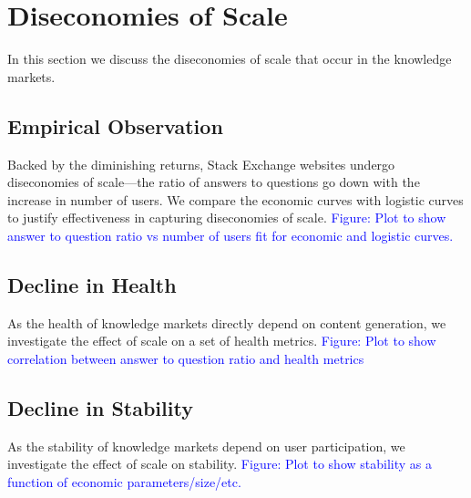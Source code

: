 \section{Diseconomies of Scale}
In this section we discuss the diseconomies of scale that occur in the knowledge markets.

\subsection{Empirical Observation}
Backed by the diminishing returns, Stack Exchange websites undergo diseconomies of scale---the ratio of answers to questions go down with the increase in number of users. We compare the economic curves with logistic curves to justify effectiveness in capturing diseconomies of scale. \textcolor{blue}{Figure: Plot to show answer to question ratio vs number of users fit for economic and logistic curves.}

\subsection{Decline in Health} 
As the health of knowledge markets directly depend on content generation, we investigate the effect of scale on a set of health metrics. \textcolor{blue}{Figure: Plot to show correlation between answer to question ratio and health metrics}

\subsection{Decline in Stability} 
As the stability of knowledge markets depend on user participation, we investigate the effect of scale on stability. \textcolor{blue}{Figure: Plot to show stability as a function of economic parameters/size/etc.}

